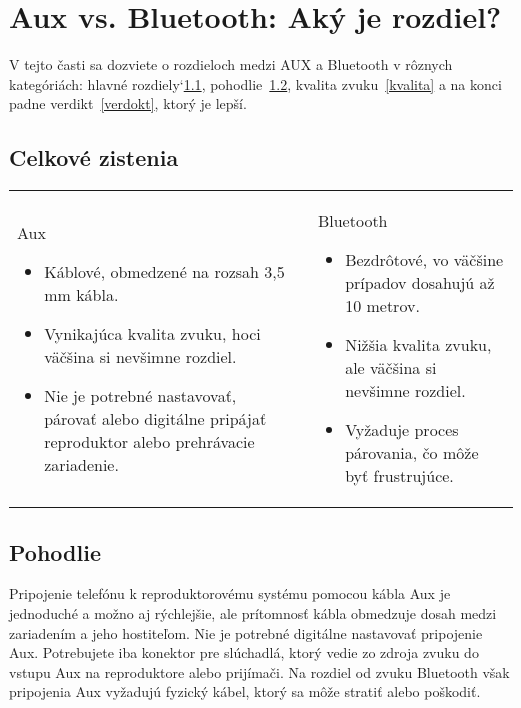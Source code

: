 \documentclass[10pt,twoside,slovak,a4paper]{article}
\begin{document}
\section{Aux vs. Bluetooth: Aký je rozdiel?} \label{rozdiel}

V tejto časti sa dozviete o rozdieloch medzi AUX a Bluetooth v rôznych kategóriách: hlavné rozdiely`\ref{celkove}, pohodlie~\ref{poh}, kvalita zvuku~\ref{kvalita} a na konci padne verdikt~\ref{verdokt}, ktorý je lepší.

\subsection{Celkové zistenia} \label{celkove}

\begin{table}[ht]
  \centering
  \begin{tabular}{p{5cm}cp{5cm}}
    Aux
\begin{itemize}
\item
Káblové, obmedzené na rozsah 3,5 mm kábla.

\item
Vynikajúca kvalita zvuku, hoci väčšina si nevšimne rozdiel.

\item
Nie je potrebné nastavovať, párovať alebo digitálne pripájať reproduktor alebo prehrávacie zariadenie.
\end{itemize} & \hfill & Bluetooth
\begin{itemize}
\item
Bezdrôtové, vo väčšine prípadov dosahujú až 10 metrov.

\item
Nižšia kvalita zvuku, ale väčšina si nevšimne rozdiel.

\item
Vyžaduje proces párovania, čo môže byť frustrujúce. 
\end{itemize}
\end{tabular}
\end{table}

\subsection{Pohodlie} \label{poh}

Pripojenie telefónu k reproduktorovému systému pomocou kábla Aux je jednoduché a možno aj rýchlejšie, ale prítomnosť kábla obmedzuje dosah medzi zariadením a jeho hostiteľom. Nie je potrebné digitálne nastavovať pripojenie Aux. Potrebujete iba konektor pre slúchadlá, ktorý vedie zo zdroja zvuku do vstupu Aux na reproduktore alebo prijímači. Na rozdiel od zvuku Bluetooth však pripojenia Aux vyžadujú fyzický kábel, ktorý sa môže stratiť alebo poškodiť.
\end{document}
